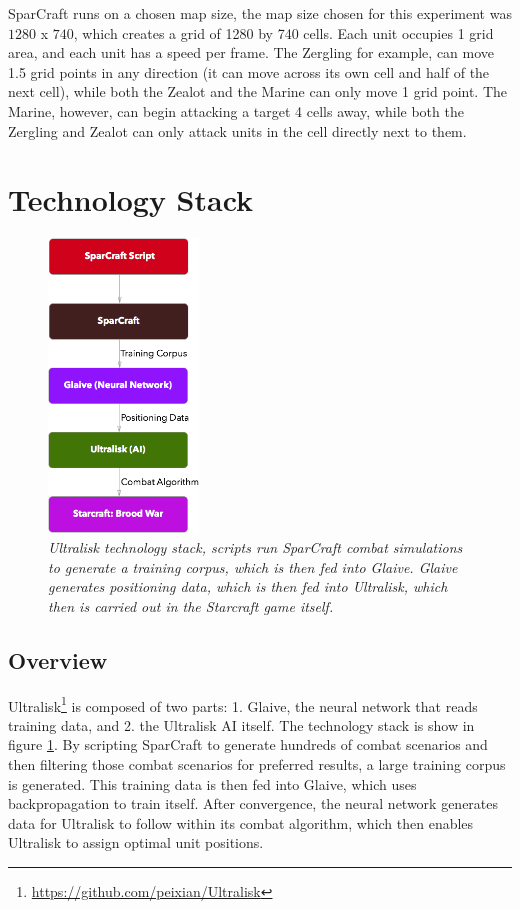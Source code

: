 \documentclass[twocolumn]{article}
\begin{document}
SparCraft runs on a chosen map size, the map size chosen for this experiment was $1280$ x $740$, which creates a grid of 1280 by 740 cells. Each unit occupies 1 grid area, and each unit has a speed per frame. The Zergling for example, can move 1.5 grid points in any direction (it can move across its own cell and half of the next cell), while both the Zealot and the Marine can only move 1 grid point. The Marine, however, can begin attacking a target 4 cells away, while both the Zergling and Zealot can only attack units in the cell directly next to them. 

\section{Technology Stack}
\begin{figure}[ht]
	\begin{center}
		\includegraphics[width=4cm]{techStack.png}
	\end{center}
	\caption{\textit{Ultralisk technology stack, scripts run SparCraft combat simulations to generate a training corpus, which is then fed into Glaive. Glaive generates positioning data, which is then fed into Ultralisk, which then is carried out in the Starcraft game itself. }}
	\label{fig:techStack}
\end{figure}

\subsection{Overview}
Ultralisk\footnote{\tiny{\url{https://github.com/peixian/Ultralisk}}} is composed of two parts: 1. Glaive, the neural network that reads training data, and 2. the Ultralisk AI itself. The technology stack is show in figure \ref{fig:techStack}. By scripting SparCraft to generate hundreds of combat scenarios and then filtering those combat scenarios for preferred results, a large training corpus is generated. This training data is then fed into Glaive, which uses backpropagation to train itself. After convergence, the neural network generates data for Ultralisk to follow within its combat algorithm, which then enables Ultralisk to assign optimal unit positions. 
\end{document}
